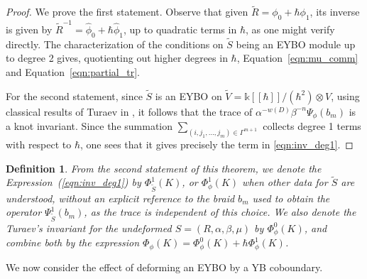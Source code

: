 \documentclass[11pt,fleqn]{amsart} %
\newtheorem{definition}[theorem]{Definition}
\begin{document}
\begin{proof}
			We prove the first statement. Observe that given 
 			$ \tilde R = \phi_0 + \hbar \phi_1$, its inverse is given by 
			$\tilde R^{-1} =  \hat \phi_0 + \hbar \hat \phi_1$, up to quadratic terms in $\hbar$, as one might verify directly. 
			The characterization of 
			 the conditions on $\tilde S$ being an EYBO module up to degree 2 gives, quotienting out higher degrees in $\hbar$,
			Equation~\eqref{eqn:mu_comm} and Equation~\eqref{eqn:partial_tr}.
	
			For the second statement, since 
			$\tilde S$ 
			is an EYBO on $\tilde V= \mathbb k[[\hbar]]/(\hbar^2) \otimes  V $,  			using classical results of Turaev in \cite{Tur}, it follows that the trace of $\alpha^{-w(D)}\beta^{-n}\Psi_\phi(b_m)$ is a knot invariant. 
			Since the summation $\sum_{(i,j_1,\ldots,j_m)\in \Gamma^{m+1}}$ collects degree 1 terms with respect to $\hbar$, one sees that it gives precisely the term in \eqref{eqn:inv_deg1}.
\end{proof}


\begin{definition}\label{def:qcocy}
	{\rm 
		From the second statement of this theorem, we denote the Expression~(\ref{eqn:inv_deg1})
	by $\Phi^1_{\tilde S}( K)$, or $\Phi^1_\phi (K)$ 
	when other data for $\tilde S$ are understood, 
	without an explicit reference to the braid $b_m$ used to obtain the operator $\Psi^1_{\tilde S} (b_m)$, as the trace is independent of this choice. 
	 We also denote the Turaev's invariant for the undeformed $S=(R,  \alpha, \beta, \mu )$ 
		by $\Phi^0_\phi( K)$, and combine both by the expression
		$\Phi_\phi(K) = \Phi^0_\phi(K) + \hbar \Phi^1_\phi(K)$. 
				}
\end{definition}

		We now consider the effect of deforming an EYBO by a YB coboundary. 
		
\end{document}
